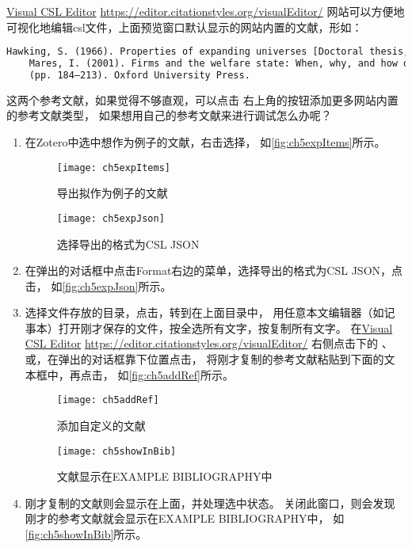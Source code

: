 \documentclass[theorem=false,mathfont=none,openany,sub3section]{easybook}
\begin{document}
{\href{https://editor.citationstyles.org/visualEditor/}{Visual CSL Editor}
\url{https://editor.citationstyles.org/visualEditor/} 
网站可以方便地可视化地编辑csl文件，上面预览窗口默认显示的网站内置的文献，形如：
\begin{lstlisting}[language=HTML]
	Hawking, S. (1966). Properties of expanding universes [Doctoral thesis, University of Cambridge]. https://doi.org/10.17863/CAM.11283
	Mares, I. (2001). Firms and the welfare state: When, why, and how does social policy matter to employers? In P. A. Hall & D. Soskice (Eds.), Varieties of capitalism. The institutional foundations of comparative advantage
	(pp. 184–213). Oxford University Press.
\end{lstlisting}
这两个参考文献，如果觉得不够直观，可以点击
右上角的按钮添加更多网站内置的参考文献类型，
如果想用自己的参考文献来进行调试怎么办呢？
\begin{enumerate}
	\item 在Zotero中选中想作为例子的文献，右击选择，
	如\autoref{fig:ch5expItems}所示。
	\begin{figure}[htbp]
		\centering
		\texttt{[image: ch5expItems]}
		\caption{导出拟作为例子的文献}
		\label{fig:ch5expItems}
	\end{figure}
	\begin{figure}[htbp]
		\centering
		\texttt{[image: ch5expJson]}
		\caption{选择导出的格式为CSL JSON}
		\label{fig:ch5expJson}
	\end{figure}
	\item 在弹出的对话框中点击Format右边的菜单，选择导出的格式为CSL JSON，点击，
	如\autoref{fig:ch5expJson}所示。
	\item 选择文件存放的目录，点击，转到在上面目录中，
	用任意本文编辑器（如记事本）打开刚才保存的文件，按全选所有文字，按复制所有文字。
	在\href{https://editor.citationstyles.org/visualEditor/}{Visual CSL Editor}
	\url{https://editor.citationstyles.org/visualEditor/} 右侧点击下的
	、或，在弹出的对话框靠下位置点击，
	将刚才复制的参考文献粘贴到下面的文本框中，再点击，
	如\autoref{fig:ch5addRef}所示。
	\begin{figure}[htbp]
		\centering
		\texttt{[image: ch5addRef]}
		\caption{添加自定义的文献}
		\label{fig:ch5addRef}
	\end{figure}
	\begin{figure}[htbp]
		\centering
		\texttt{[image: ch5showInBib]}
		\caption{文献显示在EXAMPLE BIBLIOGRAPHY中}
		\label{fig:ch5showInBib}
	\end{figure}
	\item 刚才复制的文献则会显示在上面，并处理选中状态。
	关闭此窗口，则会发现刚才的参考文献就会显示在EXAMPLE BIBLIOGRAPHY中，
	如\autoref{fig:ch5showInBib}所示。
	

\end{enumerate}}
\end{document}
